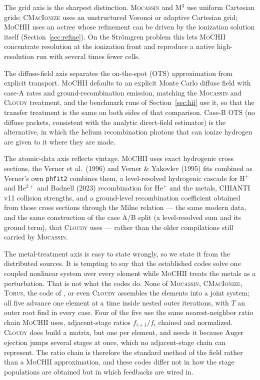\documentclass[twocolumn,linenumbers]{aastex702}
\newcommand{\code}[1]{\texttt{#1}}
\newcommand{\MoCHII}{\textsc{MoCHII}}
\begin{document}
The grid axis is the sharpest distinction.  \textsc{Mocassin} and
\textsc{M}$^{3}$ use uniform Cartesian grids; \textsc{CMacIonize} uses an
unstructured Voronoi or adaptive Cartesian grid; \MoCHII{} uses an octree
whose refinement can be driven by the ionization solution itself
(Section~\ref{sec:refine}).  On the Str\"omgren problem this lets
\MoCHII{} concentrate resolution at the ionization front and reproduce a
native high-resolution run with several times fewer cells.

The diffuse-field axis separates the on-the-spot (OTS) approximation from
explicit transport.  \MoCHII{} defaults to an explicit Monte Carlo diffuse
field with case-A rates and ground-recombination emission, matching the
\textsc{Mocassin} and \textsc{Cloudy} treatment, and the benchmark runs of
Section~\ref{sec:hii} use it, so that the transfer treatment is the same on
both sides of that comparison.  Case-B OTS (no diffuse packets, consistent
with the analytic direct-field estimator) is the alternative, in which the
helium recombination photons that can ionize hydrogen are given to it where
they are made.

The atomic-data axis reflects vintage.  \MoCHII{} uses exact hydrogenic
cross sections, the Verner et al.\ (1996) and Verner \& Yakovlev (1995)
fits combined as Verner's own \code{phfit2} combines them, a
level-resolved hydrogenic cascade for H$^{+}$ and He$^{2+}$ and Badnell (2023)
recombination for He$^{+}$ and the metals,
CHIANTI v11 collision strengths, and a ground-level recombination
coefficient obtained from those cross sections through the Milne relation
--- the same modern data, and the same construction of the case A/B split
(a level-resolved sum and its ground term),
that \textsc{Cloudy} uses --- rather than the older compilations still
carried by \textsc{Mocassin}.

The metal-treatment axis is easy to state wrongly, so we state it from the
distributed sources.  It is tempting to say that the established codes solve
one coupled nonlinear system over every element while \MoCHII{} treats the
metals as a perturbation.  That is not what the codes do.  None of
\textsc{Mocassin}, \textsc{CMacIonize}, \textsc{Torus}, the code of
\citet{wood2004}, or even \textsc{Cloudy} assembles the elements into a joint
system; all five advance one element at a time inside nested outer
iterations, with $T$ an outer root find in every case.  Four of the five use
the same nearest-neighbor ratio chain \MoCHII{} uses, adjacent-stage ratios
$f_{i+1}/f_i$ chained and normalized.  \textsc{Cloudy} does build a matrix,
but one per element, and needs it because Auger ejection jumps several stages
at once, which no adjacent-stage chain can represent.  The ratio chain is
therefore the standard method of the field rather than a \MoCHII{}
approximation, and these codes differ not in how the stage populations are
obtained but in which feedbacks are wired in.
\end{document}
